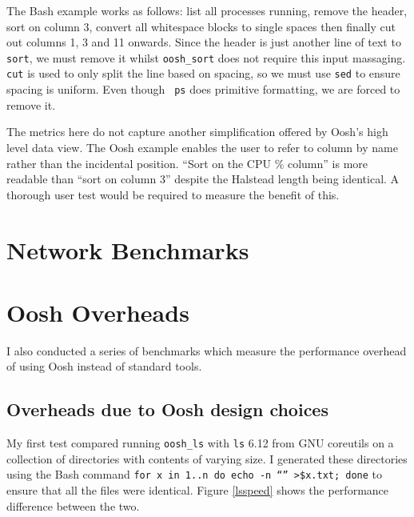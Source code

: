 \documentclass[12pt,twoside,notitlepage]{report}
\begin{document}
The Bash example works as follows: list all processes running, remove the
header, sort on column 3, convert all whitespace blocks to single spaces then
finally cut out columns 1, 3 and 11 onwards. Since the header is just another
line of text to {\tt sort}, we must remove it whilst {\tt oosh\_sort} does not
require this input massaging. {\tt cut} is used to only split the line based on
spacing, so we must use {\tt sed} to ensure spacing is uniform. Even though {\tt
  ps} does primitive formatting, we are forced to remove it.

The metrics here do not capture another simplification offered by Oosh's high
level data view. The Oosh example enables the user to refer to column by name
rather than the incidental position. ``Sort on the CPU \% column'' is more
readable than ``sort on column 3'' despite the Halstead length being
identical. A thorough user test would be required to measure the benefit of
this.


\section{Network Benchmarks}

\section{Oosh Overheads}

I also conducted a series of benchmarks which measure the performance
overhead of using Oosh instead of standard tools.

\subsection{Overheads due to Oosh design choices}
My first test compared running {\tt oosh\_ls} with {\tt ls} 6.12 from
GNU coreutils on a collection of directories with contents of varying
size. I generated these directories using the Bash command {\tt for x
  in {1..n} do echo -n ``'' >\$x.txt; done} to ensure that all the
files were identical. Figure \ref{lsspeed} shows the performance
difference between the two.
\end{document}
